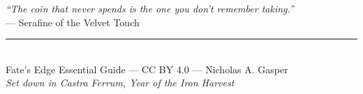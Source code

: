 \documentclass[10pt,twocolumn]{article} %
\begin{document}
\onecolumn %
\newpage
\thispagestyle{empty}
\vspace*{2cm}
\begin{center}
    {\LARGE\sffamily\itshape ``The coin that never spends is the one you don't remember taking.''}\\[1.5em]
    --- Serafine of the Velvet Touch\\[2em]
    \rule{0.5\textwidth}{0.5pt}\\[1.5em]
    {\small Fate's Edge Essential Guide --- CC BY 4.0 --- Nicholas A. Gasper}\\[0.5em]
    {\tiny \textit{Set down in Castra Ferrum, Year of the Iron Harvest}}
\end{center}
\vspace*{1.5cm}
\end{document}
